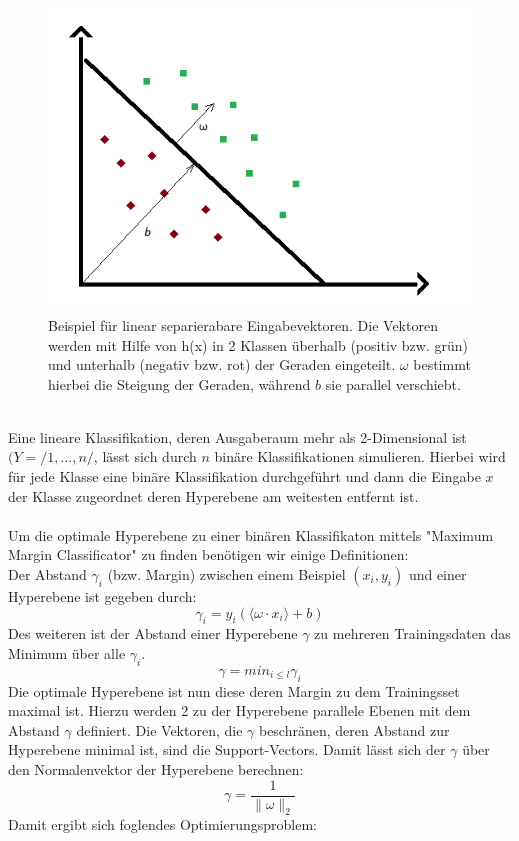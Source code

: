\begin{figure}[hbtp]
\includegraphics[width=0.7\linewidth]{LinSeparabel.png}
\centering
\caption{Beispiel für linear separierabare Eingabevektoren. Die Vektoren werden mit Hilfe von h(x) in 2 Klassen überhalb (positiv bzw. grün) und unterhalb (negativ bzw. rot) der Geraden eingeteilt. $\omega$ bestimmt hierbei die Steigung der Geraden, während $b$ sie parallel verschiebt.}
\label{fig:LinSeparabel}
\end{figure}\ \\
Eine lineare Klassifikation, deren Ausgaberaum mehr als 2-Dimensional ist $(Y = /{1,...,n/}$, lässt sich durch $n$ binäre Klassifikationen simulieren. Hierbei wird für jede Klasse eine binäre Klassifikation durchgeführt und dann die Eingabe $x$ der Klasse zugeordnet deren Hyperebene am weitesten entfernt ist.\\ \\
Um die optimale Hyperebene zu einer binären Klassifikaton mittels "Maximum Margin Classificator" zu finden benötigen wir einige Definitionen: \\
 Der Abstand $\gamma_{i}$ (bzw. Margin) zwischen einem Beispiel $(x_{i},y_{i})$ und einer Hyperebene ist gegeben durch:
\[ \gamma_{i} = y_{i}(\langle \omega \cdot x_{i} \rangle + b )\]
Des weiteren ist der Abstand einer Hyperebene $\gamma$ zu mehreren Trainingsdaten das Minimum über alle $\gamma_{i}$.
\[\gamma = min_{i\leq l} \gamma_{i}\]
Die optimale Hyperebene ist nun diese deren Margin zu dem Trainingsset maximal ist. Hierzu werden 2 zu der Hyperebene parallele Ebenen mit dem Abstand $\gamma$ definiert. Die Vektoren, die $\gamma$ beschränen, deren Abstand zur Hyperebene minimal ist, sind die Support-Vectors. Damit lässt sich der $\gamma$ über den Normalenvektor der Hyperebene berechnen:
\[\gamma = \frac{1}{\lVert \omega \rVert_{2}} \]
Damit ergibt sich foglendes Optimierungsproblem:\\

